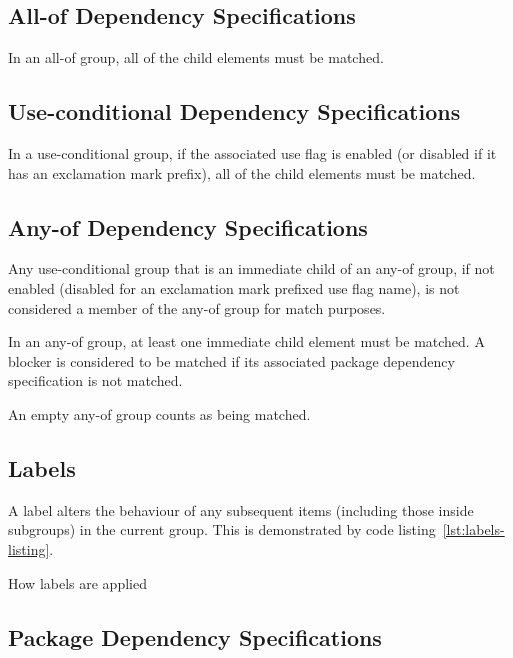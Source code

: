 \subsection{All-of Dependency Specifications}

In an all-of group, all of the child elements must be matched.

\subsection{Use-conditional Dependency Specifications}

In a use-conditional group, if the associated use flag is enabled (or disabled if it has an
exclamation mark prefix), all of the child elements must be matched.

\subsection{Any-of Dependency Specifications}

Any use-conditional group that is an immediate child of an any-of group, if not enabled (disabled
for an exclamation mark prefixed use flag name), is not considered a member of the any-of group
for match purposes.

In an any-of group, at least one immediate child element must be matched. A blocker is
considered to be matched if its associated package dependency specification is not matched.

An empty any-of group counts as being matched.

\IFKDEBUILDELSE
{
    \subsection{Labels}
    \label{labels}

    A label alters the behaviour of any subsequent items (including those inside subgroups) in the
    current group. This is demonstrated by code listing~\ref{lst:labels-listing}.

\begin{listing}
  \caption{How labels are applied}\label{lst:labels-listing}
  
\end{listing}
}{
}

\subsection{Package Dependency Specifications}

